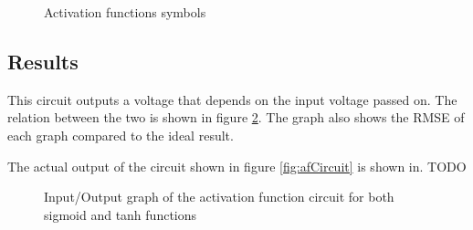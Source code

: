 \begin{figure}[H]
  \centering
  \hspace*{1.5cm}
  \hfill
  \hspace*{1.5cm}
  \caption{Activation functions symbols}
  \label{fig:afSymbol}
\end{figure}

\subsection{Results}

This circuit outputs a voltage that depends on the input voltage passed on. The relation between the two is shown in figure \ref{fig:afGraph}. The graph also shows the \ac{RMSE} of each graph compared to the ideal result.

The actual output of the circuit shown in figure \ref{fig:afCircuit} is shown in. TODO

\begin{figure}[H]
  \centering
  
  \caption{Input/Output graph of the activation function circuit for both sigmoid and \ac{tanh} functions}
  \label{fig:afGraph}
\end{figure}
